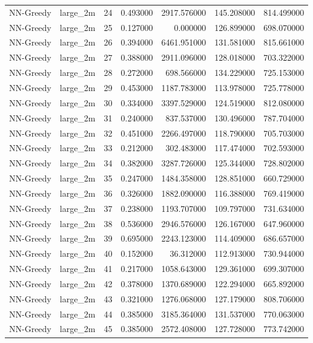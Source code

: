 \begin{tabular}{llrrrrr}
NN-Greedy & large_2m & 24 & 0.493000 & 2917.576000 & 145.208000 & 814.499000 \\
NN-Greedy & large_2m & 25 & 0.127000 & 0.000000 & 126.899000 & 698.070000 \\
NN-Greedy & large_2m & 26 & 0.394000 & 6461.951000 & 131.581000 & 815.661000 \\
NN-Greedy & large_2m & 27 & 0.388000 & 2911.096000 & 128.018000 & 703.322000 \\
NN-Greedy & large_2m & 28 & 0.272000 & 698.566000 & 134.229000 & 725.153000 \\
NN-Greedy & large_2m & 29 & 0.453000 & 1187.783000 & 113.978000 & 725.778000 \\
NN-Greedy & large_2m & 30 & 0.334000 & 3397.529000 & 124.519000 & 812.080000 \\
NN-Greedy & large_2m & 31 & 0.240000 & 837.537000 & 130.496000 & 787.704000 \\
NN-Greedy & large_2m & 32 & 0.451000 & 2266.497000 & 118.790000 & 705.703000 \\
NN-Greedy & large_2m & 33 & 0.212000 & 302.483000 & 117.474000 & 702.593000 \\
NN-Greedy & large_2m & 34 & 0.382000 & 3287.726000 & 125.344000 & 728.802000 \\
NN-Greedy & large_2m & 35 & 0.247000 & 1484.358000 & 128.851000 & 660.729000 \\
NN-Greedy & large_2m & 36 & 0.326000 & 1882.090000 & 116.388000 & 769.419000 \\
NN-Greedy & large_2m & 37 & 0.238000 & 1193.707000 & 109.797000 & 731.634000 \\
NN-Greedy & large_2m & 38 & 0.536000 & 2946.576000 & 126.167000 & 647.960000 \\
NN-Greedy & large_2m & 39 & 0.695000 & 2243.123000 & 114.409000 & 686.657000 \\
NN-Greedy & large_2m & 40 & 0.152000 & 36.312000 & 112.913000 & 730.944000 \\
NN-Greedy & large_2m & 41 & 0.217000 & 1058.643000 & 129.361000 & 699.307000 \\
NN-Greedy & large_2m & 42 & 0.378000 & 1370.689000 & 122.294000 & 665.892000 \\
NN-Greedy & large_2m & 43 & 0.321000 & 1276.068000 & 127.179000 & 808.706000 \\
NN-Greedy & large_2m & 44 & 0.385000 & 3185.364000 & 131.537000 & 770.063000 \\
NN-Greedy & large_2m & 45 & 0.385000 & 2572.408000 & 127.728000 & 773.742000 \\

\end{tabular}
